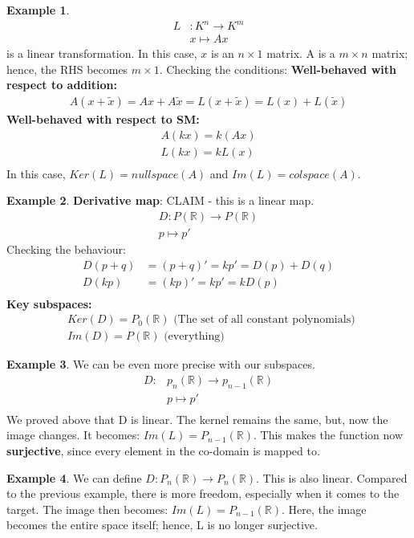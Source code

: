 \documentclass[a4paper, 12pt]{article}
\theoremstyle{definition}
\newtheorem{exmp}{Example}[section]
\theoremstyle{definition}
\theoremstyle{definition}
\theoremstyle{definition}
\begin{document}
{\begin{exmp}
\begin{align*}
	L &: K^n \rightarrow K^m \\
	  & x \mapsto Ax 
\end{align*}
is a linear transformation. In this case, $x$ is an $n \times 1$ matrix. A is a $m \times n$ matrix; hence, the RHS becomes $m \times 1$. Checking the conditions:
\newline 
\newline 
\textbf{Well-behaved with respect to addition:} 
\begin{align*}
	A(x + \tilde{x}) = Ax + A \tilde{x}  = L(x + \tilde{x}) = L(x) + L( \tilde{x} ) 
\end{align*}
\textbf{Well-behaved with respect to SM:}
\begin{align*}
	A(kx) = k(Ax)  \\
	L(kx) = kL(x) \\ 
\end{align*}
In this case, $Ker(L) = nullspace(A)$ and $Im(L) = colspace(A)$. 

\end{exmp}
\begin{exmp}
	\textbf{Derivative map}: CLAIM - this is a linear map. 
	\begin{align*}
		D: P(\mathbb{R}) \rightarrow P(\mathbb{R}) \\
		p \mapsto p' 
	\end{align*}
	Checking the behaviour: 
	\begin{align*}
		D(p+q) & = (p+q)' = kp' = D(p) + D(q) \\ 
		D(kp) & = (kp)' = kp' = kD(p) \\ 
	\end{align*}
	\textbf{Key subspaces:}
	\begin{align*}
		 & Ker(D) = P_0 (\mathbb{R}) \mbox{ (The set of all constant polynomials) }  \\
		& Im(D) = P(\mathbb{R}) \mbox{ (everything) }  
	\end{align*}
\end{exmp}

\begin{exmp}
	We can be even more precise with our subspaces. 
	\begin{align*}
		D: & p_n (\mathbb{R}) \rightarrow p_{n-1} (\mathbb{R}) \\
	 & p \mapsto p' \\ 
	\end{align*}
	We proved above that D is linear. The kernel remains the same, but, now the image changes. It becomes: $Im(L) = P_{n-1} (\mathbb{R})$. This makes the function now \textbf{surjective}, since every element in the co-domain is mapped to.
\end{exmp}
\begin{exmp}
	We can define $D: P_n (\mathbb{R}) \rightarrow P_n(\mathbb{R})$. This is also linear. Compared to the previous example, there is more freedom, especially when it comes to the target. The image then becomes: $Im(L) = P_{n-1} (\mathbb{R})$. Here, the image becomes the entire space itself; hence, L is no longer surjective. 
\end{exmp}

}
\end{document}
